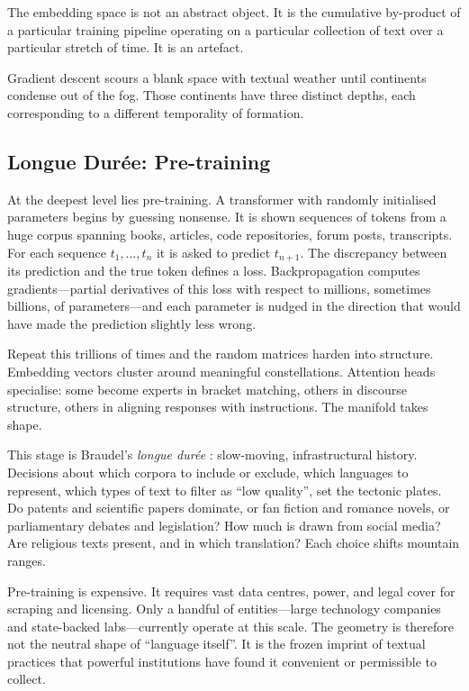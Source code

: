 \documentclass[12pt,a4paper]{article}
\begin{document}
The embedding space is not an abstract object. It is the cumulative by-product of a particular training pipeline operating on a particular collection of text over a particular stretch of time. It is an artefact.

Gradient descent scours a blank space with textual weather until continents condense out of the fog. Those continents have three distinct depths, each corresponding to a different temporality of formation.

\subsection{Longue Dur\'{e}e: Pre-training}

At the deepest level lies pre-training. A transformer with randomly initialised parameters begins by guessing nonsense. It is shown sequences of tokens from a huge corpus spanning books, articles, code repositories, forum posts, transcripts. For each sequence $t_1,\dots,t_n$ it is asked to predict $t_{n+1}$. The discrepancy between its prediction and the true token defines a loss. Backpropagation computes gradients---partial derivatives of this loss with respect to millions, sometimes billions, of parameters---and each parameter is nudged in the direction that would have made the prediction slightly less wrong.

Repeat this trillions of times and the random matrices harden into structure. Embedding vectors cluster around meaningful constellations. Attention heads specialise: some become experts in bracket matching, others in discourse structure, others in aligning responses with instructions. The manifold takes shape.

This stage is Braudel's \emph{longue dur\'{e}e} \cite{braudel1980}: slow-moving, infrastructural history. Decisions about which corpora to include or exclude, which languages to represent, which types of text to filter as ``low quality'', set the tectonic plates. Do patents and scientific papers dominate, or fan fiction and romance novels, or parliamentary debates and legislation? How much is drawn from social media? Are religious texts present, and in which translation? Each choice shifts mountain ranges.

Pre-training is expensive. It requires vast data centres, power, and legal cover for scraping and licensing. Only a handful of entities---large technology companies and state-backed labs---currently operate at this scale. The geometry is therefore not the neutral shape of ``language itself''. It is the frozen imprint of textual practices that powerful institutions have found it convenient or permissible to collect.
\end{document}
